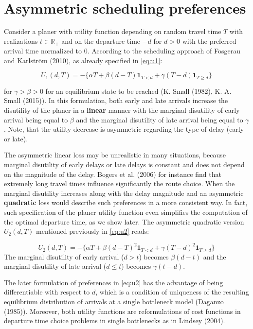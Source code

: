 \documentclass[
]{article}
\theoremstyle{definition}
\theoremstyle{definition}
\theoremstyle{definition}
\theoremstyle{definition}
\theoremstyle{remark}
\begin{document}
\hypertarget{asymmetric-scheduling-preferences}{%
\section{Asymmetric scheduling preferences}\label{asymmetric-scheduling-preferences}}

Consider a planer with utility function depending on random travel time \(T\) with realizations \(t\in\mathbb R_+\) and on the departure time \(-d\) for \(d>0\) with the preferred arrival time normalized to \(0\). According to the scheduling approach of Fosgerau and Karlström (2010), as already specified in \eqref{eq:u1}:

\[U_1(d,T) = -\{\alpha T + \beta(d-T)\mathbf 1_{T<d} + \gamma (T-d)\mathbf 1_{T\geq d}\}\]

for \(\gamma>\beta>0\) for an equilibrium state to be reached (K. Small (1982), K. A. Small (2015)). In this formulation, both early and late arrivals increase the disutility of the planer in a \textbf{linear} manner with the marginal disutility of early arrival being equal to \(\beta\) and the marginal disutility of late arrival being equal to \(\gamma\). Note, that the utility decrease is asymmetric regarding the type of delay (early or late).

The asymmetric linear loss may be unrealistic in many situations, because marginal disutility of early delays or late delays is constant and does not depend on the magnitude of the delay. Bogers et al. (2006) for instance find that extremely long travel times influence significantly the route choice. When the marginal disutility increases along with the delay magnitude and an asymmetric \textbf{quadratic} loss would describe such preferences in a more consistent way. In fact, such specification of the planer utility function even simplifies the computation of the optimal departure time, as we show later. The asymmetric quadratic version \(U_2(d,T)\) mentioned previously in \eqref{eq:u2} reads:

\[U_2(d,T) = -\{\alpha T + \beta(d-T)^2\mathbf 1_{T<d} + \gamma (T-d)^2\mathbf 1_{T\geq d}\}\]
The marginal disutility of early arrival (\(d>t\)) becomes \(\beta (d-t)\) and the marginal disutility of late arrival (\(d\leq t\)) becomes \(\gamma (t-d)\).

The later formulation of preferences in \eqref{eq:u2} has the advantage of being differentiable with respect to \(d\), which is a condition of uniqueness of the resulting equilibrium distribution of arrivals at a single bottleneck model (Daganzo (1985)). Moreover, both utility functions are reformulations of cost functions in departure time choice problems in single bottlenecks as in Lindsey (2004).
\end{document}
